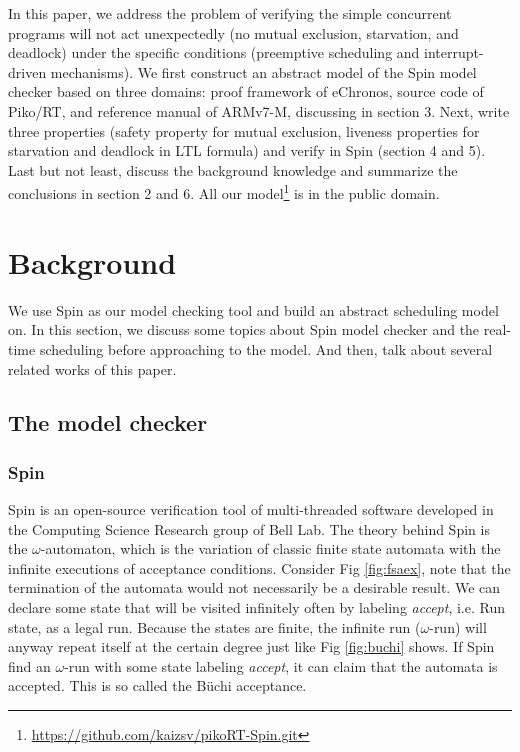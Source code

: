In this paper, we address the problem of verifying the simple concurrent programs will not act unexpectedly (no mutual exclusion, starvation, and deadlock) under the specific conditions (preemptive scheduling and interrupt-driven mechanisms). We first construct an abstract model of the Spin model checker based on three domains: proof framework of eChronos, source code of Piko/RT, and reference manual of ARMv7-M, discussing in section 3. Next, write three properties (safety property for mutual exclusion, liveness properties for starvation and deadlock in LTL formula) and verify in Spin (section 4 and 5). Last but not least, discuss the background knowledge and summarize the conclusions in section 2 and 6. All our model\footnote{\url{https://github.com/kaizsv/pikoRT-Spin.git}} is in the public domain.

\section{Background}
We use Spin as our model checking tool and build an abstract scheduling model on. In this section, we discuss some topics about Spin model checker and the real-time scheduling before approaching to the model. And then, talk about several related works of this paper.

\subsection{The model checker}
\subsubsection{Spin}
Spin \cite{SpinRoot, Ben-Ari:2008:PSM:1349767, Holzmann:2003:SMC:1405716} is an open-source verification tool of multi-threaded software developed in the Computing Science Research group of Bell Lab. The theory behind Spin is the $\omega$-automaton, which is the variation of classic finite state automata with the infinite executions of acceptance conditions. Consider Fig \ref{fig:fsaex}, note that the termination of the automata would not necessarily be a desirable result. We can declare some state that will be visited infinitely often by labeling \textit{accept}, i.e. Run state, as a legal run. Because the states are finite, the infinite run ($\omega$-run) will anyway repeat itself at the certain degree just like Fig \ref{fig:buchi} shows. If Spin find an $\omega$-run with some state labeling \textit{accept}, it can claim that the automata is accepted. This is so called the B\"uchi acceptance.

